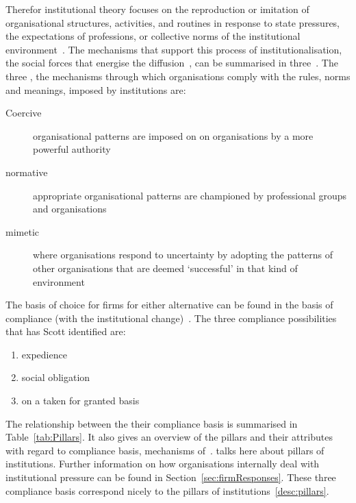 Therefor institutional theory focuses on the reproduction or imitation of organisational structures, activities, and routines in response to state pressures, the expectations of professions, or collective norms of the institutional environment~\citep{DiMaggio:1983wt,Zucker:1987vn}.
The mechanisms that support this process of institutionalisation, the social forces that energise the diffusion~\citep{DiMaggio:1983wt}, can be summarised in three~\isos.
The three \isos, the mechanisms through which organisations comply with the rules, norms and meanings, imposed by institutions are:


\begin{description}
\item[Coercive \iso] organisational patterns are imposed on on organisations by a more powerful authority 
\item[normative \iso] appropriate organisational patterns are championed by professional groups and organisations
\item[mimetic \iso] where organisations respond to uncertainty by adopting the patterns of other organisations that are deemed `successful' in that kind of environment~\citep{Westney:2005vv,DiMaggio:1983wt,Peng:2008us,Kostova:1999wt,Scott:2001tt}
\end{description}
The basis of choice for firms for either alternative \isos can be found in the basis of compliance (with the institutional change)~\citep{Scott:2005us}.
The three compliance possibilities that has Scott identified are:
\begin{enumerate}
  \item expedience
  \item social obligation
  \item on a taken for granted basis
\end{enumerate}
The relationship between the \isos their compliance basis is summarised in Table~\ref{tab:Pillars}. 
It also gives an overview of the pillars and their attributes with regard to compliance basis, mechanisms of~\iso.
\cite{Scott:2005us} talks here about pillars of institutions.
Further information on how organisations internally deal with institutional pressure can be found in Section~\ref{sec:firmResponses}.
These three compliance basis correspond nicely to the pillars of institutions~\ref{desc:pillars}.



